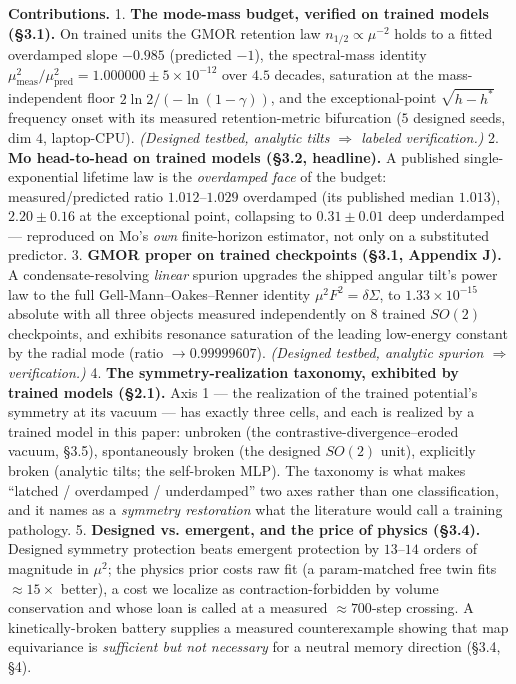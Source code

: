 \documentclass[10pt]{article}
\begin{document}
\textbf{Contributions.}
1. \textbf{The mode-mass budget, verified on trained models (\S3.1).} On trained units the GMOR retention law $n_{1/2}\propto\mu^{-2}$ holds to a fitted overdamped slope $-0.985$ (predicted $-1$), the spectral-mass identity $\mu^2_{\mathrm{meas}}/\mu^2_{\mathrm{pred}}=1.000000\pm5\!\times\!10^{-12}$ over $4.5$ decades, saturation at the mass-independent floor $2\ln2/(-\ln(1-\gamma))$, and the exceptional-point $\sqrt{h-h^*}$ frequency onset with its measured retention-metric bifurcation ($5$ designed seeds, dim $4$, laptop-CPU). \emph{(Designed testbed, analytic tilts $\Rightarrow$ labeled verification.)}
2. \textbf{Mo head-to-head on trained models (\S3.2, headline).} A published single-exponential lifetime law is the \emph{overdamped face} of the budget: measured/predicted ratio $1.012$--$1.029$ overdamped (its published median $1.013$), $2.20\pm0.16$ at the exceptional point, collapsing to $0.31\pm0.01$ deep underdamped --- reproduced on Mo's \emph{own} finite-horizon estimator, not only on a substituted predictor.
3. \textbf{GMOR proper on trained checkpoints (\S3.1, Appendix J).} A condensate-resolving \emph{linear} spurion upgrades the shipped angular tilt's power law to the full Gell-Mann--Oakes--Renner identity $\mu^2F^2=\delta\Sigma$, to $1.33\!\times\!10^{-15}$ absolute with all three objects measured independently on $8$ trained $SO(2)$ checkpoints, and exhibits resonance saturation of the leading low-energy constant by the radial mode (ratio $\to0.99999607$). \emph{(Designed testbed, analytic spurion $\Rightarrow$ verification.)}
4. \textbf{The symmetry-realization taxonomy, exhibited by trained models (\S2.1).} Axis 1 --- the realization of the trained potential's symmetry at its vacuum --- has exactly three cells, and each is realized by a trained model in this paper: unbroken (the contrastive-divergence--eroded vacuum, \S3.5), spontaneously broken (the designed $SO(2)$ unit), explicitly broken (analytic tilts; the self-broken MLP). The taxonomy is what makes ``latched / overdamped / underdamped'' two axes rather than one classification, and it names as a \emph{symmetry restoration} what the literature would call a training pathology.
5. \textbf{Designed vs. emergent, and the price of physics (\S3.4).} Designed symmetry protection beats emergent protection by $13$--$14$ orders of magnitude in $\mu^2$; the physics prior costs raw fit (a param-matched free twin fits $\approx15\times$ better), a cost we localize as contraction-forbidden by volume conservation and whose loan is called at a measured $\approx700$-step crossing. A kinetically-broken battery supplies a measured counterexample showing that map equivariance is \emph{sufficient but not necessary} for a neutral memory direction (\S3.4, \S4).
\end{document}
